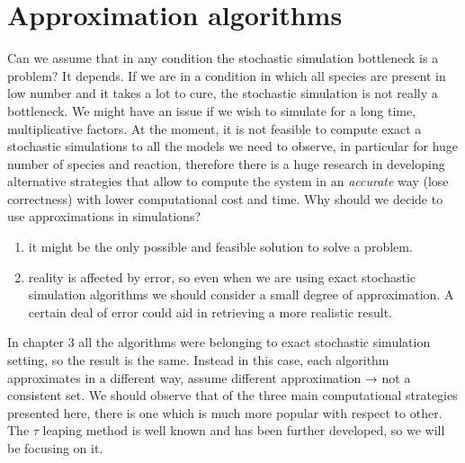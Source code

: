 \graphicspath{{chapters/04/images}}
\chapter{Approximation algorithms}
Can we assume that in any condition the stochastic simulation bottleneck is a problem? It depends.
If we are in a condition in which all species are present in low number and it takes a lot to cure, the stochastic simulation is not really a bottleneck.
We might have an issue if we wish to simulate for a long time, multiplicative factors.
At the moment, it is not feasible to compute exact a stochastic simulations to all the models we need to observe, in particular for huge number of species and reaction, therefore there is a huge research in developing alternative strategies that allow to compute the system in an \emph{accurate} way (lose correctness) with lower computational cost and time.
Why should we decide to use approximations in simulations?

\begin{enumerate}
  \def\labelenumi{\arabic{enumi}.}
  \item it might be the only possible and feasible solution to solve a problem.
  \item reality is affected by error, so even when we are using exact stochastic simulation algorithms we should consider a small degree of approximation.
    A certain deal of error could aid in retrieving a more realistic result.
\end{enumerate}

In chapter 3 all the algorithms were belonging to exact stochastic simulation setting, so the result is the same.
Instead in this case, each algorithm approximates in a different way, assume different approximation → not a consistent set.
We should observe that of the three main computational strategies presented here, there is one which is much more popular with respect to other.
The $\tau$ leaping method is well known and has been further developed, so we will be focusing on it.

